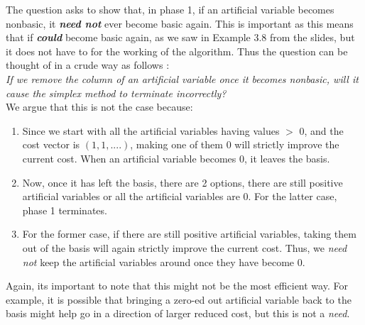 The question asks to show that, in phase 1, if an artificial variable becomes nonbasic, it \textit{\textbf{need not}} ever become basic again. This is important as this means that if \textit{\textbf{could}} become basic again, as we saw in Example 3.8 from the slides, but it does not have to for the working of the algorithm. Thus the question can be thought of in a crude way as follows : \\
\textit{If we remove the column of an artificial variable once it becomes nonbasic, will it cause the simplex method to terminate incorrectly?} \\
We argue that this is not the case because:

\begin{enumerate}
    \item Since we start with all the artificial variables having values $>$ 0, and the cost vector is $(1,1,....)$, making one of them 0 will strictly improve the current cost. When an artificial variable becomes 0, it leaves the basis. 
    \item Now, once it has left the basis, there are 2 options, there are still positive artificial variables or all the artificial variables are 0. For the latter case, phase 1 terminates.
    \item For the former case, if there are still positive artificial variables, taking them out of the basis will again strictly improve the current cost. Thus, we \textit{need not} keep the artificial variables around once they have become 0.
\end{enumerate}

Again, its important to note that this might not be the most efficient way. For example, it is possible that bringing a zero-ed out artificial variable back to the basis might help go in a direction of larger reduced cost, but this is not a \textit{need}.
